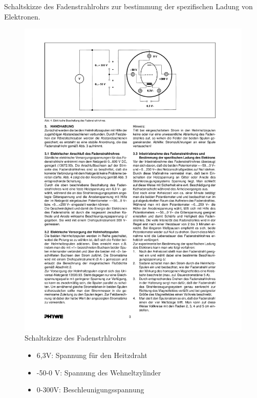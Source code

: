 \documentclass[12pt,a4paper]{article}
\begin{document}
Schaltskizze des Fadenstrahlrohrs zur bestimmung der spezifischen Ladung von Elektronen.

\begin{figure}[H] 
  \centering
    \includegraphics[trim = 10mm 210mm 10mm 10mm, clip, scale = 1]{fadenstrahlrohr.pdf}
  	\caption[Schaltskizze des Fadenstrhlrohrs]{Schaltskizze des Fadenstrhlrohrs\footnotemark}
  \label{fig:aufbau_h}
\end{figure}

\begin{figure}[H]
\begin{itemize}
\item	6,3V:		Spannung für den Heitzdraht

\item	-50-0 V:	Spannung des Wehneltzylinder

\item	0-300V:		Beschleunigungsspannung
\end{itemize}
\end{figure}
\end{document}
